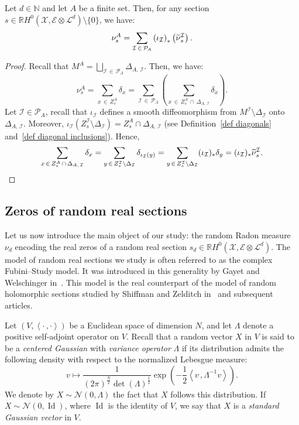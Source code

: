 \documentclass[AHL,Unicode,longabstracts,published]{cedram}
\DeclareMathOperator{\Id}{Id}
\newcommand{\E}{\mathcal{E}}
\newcommand{\I}{\mathcal{I}}
\newcommand{\X}{\mathcal{X}}
\renewcommand{\L}{\mathcal{L}}
\newcommand{\clN}{\mathcal{N}}
\newcommand{\pa}{\mathcal{P}\!}
\newcommand{\N}{\mathbb{N}}
\newcommand{\R}{\mathbb{R}}
\newcommand{\prsc}[2]{\left\langle #1\,, #2 \right\rangle}
\renewcommand{\H}{H^0(\X,\E \otimes \L^d)}
\renewcommand{\tilde}{\widetilde}
\let\oldtilde\tilde
\renewcommand*{\tilde}[1]{\mathchoice{\widetilde{#1}}{\widetilde{#1}}{\oldtilde{#1}}{\oldtilde{#1}}}
\begin{document}
\begin{lemm}\label{lem decomposition nu ks}
Let $d \in \N$ and let $A$ be a finite set. Then, for any section $s \in \R\H \setminus \{0\}$, we have:
\[
\nu^A_s = \sum_{\I\,\in\,\pa_A} \left(\iota_\I\right)_*\left(\tilde{\nu}^\I_s\right).
\]
\end{lemm}

\begin{proof}
Recall that $M^A = \bigsqcup_{\I\,\in\,\pa_A} \Delta_{A,\,\I}$. Then, we have:
\[
\nu^A_s = \sum_{x\,\in\,Z_s^A} \delta_x = \sum_{\I\,\in\,\pa_A} \left(\sum_{x\,\in\,Z_s^A\,\cap\,\Delta_{A,\,\I}} \delta_x\right).
\]
Let $\I \in \pa_A$, recall that $\iota_\I$ defines a smooth diffeomorphism from $M^\I \setminus \Delta_\I$ onto $\Delta_{A,\,\I}$. Moreover, $\iota_\I(Z^\I_s\setminus \Delta_\I) = Z^A_s \cap \Delta_{A,\,\I}$ (see Definition~\ref{def diagonals} and~\ref{def diagonal inclusions}). Hence,
\[
\sum_{x\,\in\,Z_s^A\,\cap\,\Delta_{A,\,\I}} \delta_x = \sum_{y\,\in\,Z^\I_s \setminus \Delta_\I} \delta_{\iota_\I(y)} = \sum_{y\,\in\,Z^\I_s \setminus \Delta_\I} (\iota_\I)_*\delta_y = (\iota_\I)_*\tilde{\nu}^\I_s.\qedhere
\]
\end{proof}



\subsection{Zeros of random real sections}\label{subsec zeros of random real sections}

Let us now introduce the main object of our study: the random Radon measure $\nu_d$ encoding the real zeros of a random real section $s_d \in \R\H$. The model of random real sections we study is often referred to as the complex Fubini--Study model. It was introduced in this generality by Gayet and Welschinger in~\cite{GW2011}. This model is the real counterpart of the model of random holomorphic sections studied by Shiffman and Zelditch in~\cite{SZ1999} and subsequent articles.

\begin{defi}\label{def Gaussian distribution}
Let $(V,\prsc{\cdot}{\cdot})$ be a Euclidean space of dimension $N$, and let $\Lambda$ denote a positive self-adjoint operator on $V$. Recall that a random vector $X$ in $V$ is said to be a \emph{centered Gaussian} with \emph{variance operator} $\Lambda$ if its distribution admits the following density with respect to the normalized Lebesgue measure:
\[
v \mapsto \frac{1}{(2\pi)^\frac{N}{2} \det(\Lambda)^\frac{1}{2}} \exp\left(-\frac{1}{2}\prsc{v}{\Lambda^{-1}v}\right).
\]
We denote by $X \sim \clN(0,\Lambda)$ the fact that $X$ follows this distribution. If $X \sim \clN(0,\Id)$, where $\Id$ is the identity of $V$, we say that $X$ is a \emph{standard Gaussian vector} in $V$.
\end{defi}
\end{document}
